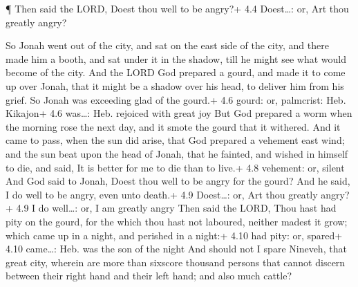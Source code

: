  ¶ Then said the LORD, Doest thou well to be angry?+ 4.4
Doest\ldots: or, Art thou greatly angry?

 So Jonah went out of the city, and sat on the east side of
the city, and there made him a booth, and sat under it in the shadow,
till he might see what would become of the city.  And the
LORD God prepared a gourd, and made it to come up over Jonah, that it
might be a shadow over his head, to deliver him from his grief. So Jonah
was exceeding glad of the gourd.+ 4.6 gourd: or, palmcrist: Heb.
Kikajon+ 4.6 was\ldots: Heb. rejoiced with great joy  But
God prepared a worm when the morning rose the next day, and it smote the
gourd that it withered.  And it came to pass, when the sun
did arise, that God prepared a vehement east wind; and the sun beat upon
the head of Jonah, that he fainted, and wished in himself to die, and
said, It is better for me to die than to live.+ 4.8 vehement: or, silent
 And God said to Jonah, Doest thou well to be angry for the
gourd? And he said, I do well to be angry, even unto death.+ 4.9
Doest\ldots: or, Art thou greatly angry?+ 4.9 I do well\ldots: or, I am
greatly angry  Then said the LORD, Thou hast had pity on
the gourd, for the which thou hast not laboured, neither madest it grow;
which came up in a night, and perished in a night:+ 4.10 had pity: or,
spared+ 4.10 came\ldots: Heb. was the son of the night  And
should not I spare Nineveh, that great city, wherein are more than
sixscore thousand persons that cannot discern between their right hand
and their left hand; and also much cattle?
